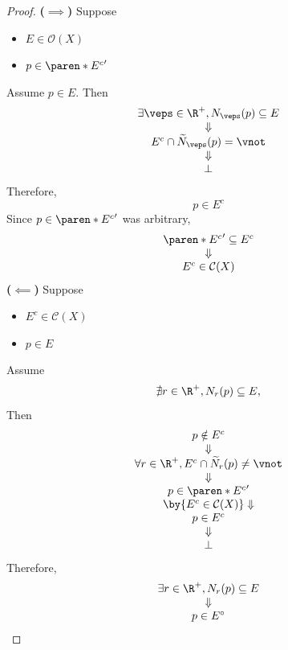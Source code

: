 \begin{proof}
  \textbf{($\implies$)} Suppose
  \begin{itemize}
    \item $E \in \mathcal{O}(X)$
    \item $p \in \paren*{E^{c}}'$
  \end{itemize}
  Assume $p \in E$. Then
  \[
    \begin{array}{c}
      \exists \veps \in \R^{+}, N_{\veps}(p) \subseteq E \\
      \Downarrow                                         \\
      E^{c} \cap \widetilde{N}_{\veps}(p) = \vnot        \\
      \Downarrow                                         \\
      \bot
    \end{array}
  \]
  Therefore,
  \[
    p \in E^{c}
  \]
  Since $p \in \paren*{E^{c}}'$ was arbitrary,
  \[
    \begin{array}{c}
      \paren*{E^{c}}' \subseteq E^{c} \\
      \Downarrow                      \\
      E^{c} \in \mathcal{C}(X)
    \end{array}
  \]
  \textbf{($\impliedby$)} Suppose
  \begin{itemize}
    \item $E^{c} \in \mathcal{C}(X)$
    \item $p \in E$
  \end{itemize}
  Assume
  \[
    \nexists r \in \R^{+}, N_{r}(p) \subseteq E,
  \]
  Then
  \[
    \begin{array}{c}
      p \notin E^{c}                                                   \\
      \Downarrow                                                       \\
      \forall r \in \R^{+}, E^{c} \cap \widetilde{N}_{r}(p) \neq \vnot \\
      \Downarrow                                                       \\
      p \in \paren*{E^{c}}'                                            \\
      \by{\ensuremath{E^{c} \in \mathcal{C}(X)}}\Downarrow             \\
      p \in E^{c}                                                      \\
      \Downarrow                                                       \\
      \bot
    \end{array}
  \]
  Therefore,
  \[
    \begin{array}{c}
      \exists r \in \R^{+}, N_{r}(p) \subseteq E \\
      \Downarrow                                 \\
      p \in E^{\circ}
    \end{array}
  \]
\end{proof}

